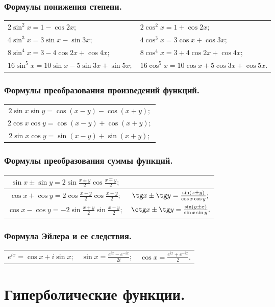 \subsubsection{Формулы понижения степени.}
\begin{tabular}{ l l }
$2\sin^2x=1-\cos 2x;$
&
$2\cos^2x=1+\cos 2x;$
\\
$4\sin^3x=3\sin x-\sin 3x;$
&
$4\cos^3x=3\cos x+\cos 3x;$
\\
$8\sin^4x=3-4\cos2x+\cos4x;$
&
$8\cos^4x=3+4\cos2x+\cos4x;$
\\
$16\sin^5x=10\sin x-5\sin 3x +\sin 5x;$
&
$16\cos^5x=10\cos x+5\cos 3x +\cos 5x.$
\end{tabular}
\subsubsection{Формулы преобразования произведений функций.}
\begin{tabular}{c}
$2\sin x \sin y = \cos (x-y)-\cos(x+y);$
\\
$2\cos x \cos y = \cos (x-y)+\cos(x+y);$
\\
$2\sin x \cos y = \sin (x-y)+\sin(x+y);$
\end{tabular}
\subsubsection{Формулы преобразования суммы функций.}
\begin{tabular}{|c|c|}
$\sin x\pm \sin y =2 \sin \frac{x\pm y}{2} \cos \frac{x\mp y}{2};$
&
$ $
\\\hline
$\cos x + \cos y  = 2 \cos \frac{x + y}{2} \cos \frac{x - y}{2};$
&
$\tg x \pm \tg y = \frac{\sin (x \pm y)}{ \cos x \cos y};$
\\\hline
$\cos x - \cos y  = -2 \sin \frac{x + y}{2} \sin\frac{x - y}{2};$
&
$\ctg x \pm \tg y = \frac{\sin (y \pm x)}{ \sin x \sin y}.$
\end{tabular}
\subsubsection{Формула Эйлера и ее следствия.}
\begin{tabular}{c c c}
$e^{ix} = \cos x + i \sin x;$
&
$\sin x = \frac{e^{ix}-e^{-ix}}{2i};$
&
$\cos x = \frac{e^{ix}+e^{-ix}}{2}.$
\end{tabular}
\section{Гиперболические функции.}

